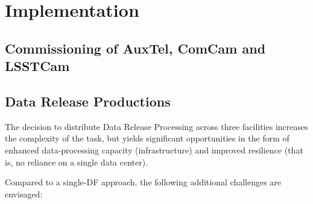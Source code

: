 \section{Implementation}\label{sec:implementation}



\subsection{Commissioning of AuxTel, ComCam and LSSTCam}




\subsection{Data \gls{Release} Productions}

The decision to distribute Data Release Processing across three facilities increases the complexity of the task, but yields significant opportunities in the form of enhanced data-processing capacity (infrastructure) and improved resilience (that is, no reliance on a single data center).

Compared to a single-DF approach, the following additional challenges are envisaged:

